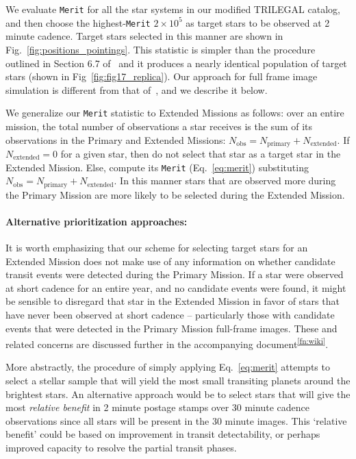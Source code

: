 We evaluate \texttt{Merit} for all the star systems in our modified
TRILEGAL catalog, and then choose the highest-\texttt{Merit} 
$2\times10^5$ as target
stars to be observed at 2 minute cadence.  Target stars selected in
this manner are shown in Fig.~\ref{fig:positions_pointings}. 
This statistic is simpler than the procedure outlined in Section 6.7
of~ and it produces a nearly identical
population of target stars (shown in Fig~\ref{fig:fig17_replica}).
Our approach for full frame image simulation is different from that
of~, and we describe it below.

We generalize our \texttt{Merit} statistic to Extended Missions as 
follows: over an
entire mission, the total number of observations a star receives is
the sum of its observations in the Primary and Extended Missions:
$N_\text{obs}=N_\text{primary}+N_\text{extended}$.  If
$N_\text{extended}=0$ for a given star, then do not select that star as a
target star in the Extended Mission.  Else, compute its \texttt{Merit}
(Eq.~\ref{eq:merit}) substituting
$N_\text{obs}=N_\text{primary}+N_\text{extended}$.  In this manner
stars that are observed more during the Primary Mission are more
likely to be selected during the Extended Mission.
 

\paragraph{Alternative prioritization approaches:}

It is worth emphasizing that our scheme for selecting target stars for
an Extended Mission does not make use of any information on whether
candidate transit events were detected during the Primary Mission.  If
a star were observed at short cadence for an entire year, and no
candidate events were found, it might be sensible to disregard that
star in the Extended Mission in favor of stars that have never been
observed at short cadence -- particularly those with candidate events
that were detected in the Primary Mission full-frame images.  These
and related concerns are discussed further in the accompanying
document\textsuperscript{\ref{fn:wiki}}.

More abstractly, the procedure of simply applying Eq.~\ref{eq:merit}
attempts to select a stellar sample that will yield the most small
transiting planets around the brightest stars.  An alternative
approach would be to select stars that will give the most 
\textit{relative benefit} in 2 minute postage stamps over 30 
minute cadence observations since all stars will be present in the
30 minute images.  This `relative benefit' could be based on
improvement in transit detectability, or perhaps improved 
capacity to resolve the partial transit phases.

